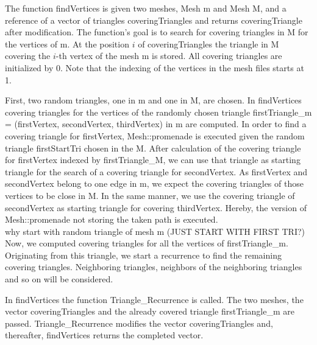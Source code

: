 \documentclass[10pt]{article}
\begin{document}
The function {\ttfamily findVertices} is given two meshes, {\ttfamily Mesh m} and {\ttfamily Mesh M}, and a reference of a vector of triangles {\ttfamily coveringTriangles} and returns {\ttfamily coveringTriangle} after modification. The function's goal is to search for covering triangles in {\ttfamily M} for the vertices of {\ttfamily  m}. At the position $i$ of {\ttfamily coveringTriangles} the triangle in {\ttfamily M} covering the $i$-th vertex of the mesh {\ttfamily m} is stored. All covering triangles are initialized by 0. Note that the indexing of the vertices in the mesh files starts at 1.

First, two random triangles, one in {\ttfamily m} and one in {\ttfamily M}, are chosen. In {\ttfamily findVertices} covering triangles for the vertices of the randomly chosen triangle {\ttfamily firstTriangle\_m = (firstVertex, secondVertex, thirdVertex)} in {\ttfamily m} are computed. In order to find a covering triangle for {\ttfamily firstVertex}, {\ttfamily Mesh::promenade} is executed given the random triangle {\ttfamily firstStartTri} chosen in the {\ttfamily M}. After calculation of the covering triangle for {\ttfamily firstVertex} indexed by {\ttfamily firstTriangle\_M}, we can use that triangle as starting triangle for the search of a covering triangle for {\ttfamily secondVertex}. As {\ttfamily firstVertex} and {\ttfamily secondVertex} belong to one edge in {\ttfamily m}, we expect the covering triangles of those vertices to be close in {\ttfamily M}. In the same manner, we use the covering triangle of {\ttfamily secondVertex} as starting triangle for covering {\ttfamily thirdVertex}. Hereby, the version of {\ttfamily Mesh::promenade} not storing the taken path is executed.\\

why start with random triangle of mesh m (JUST START WITH FIRST TRI?)\\

Now, we computed covering triangles for all the vertices of {\ttfamily firstTriangle\_m}. Originating from this triangle, we start a recurrence to find the remaining covering triangles. Neighboring triangles, neighbors of the neighboring triangles and so on will be considered.

In {\ttfamily findVertices} the function {\ttfamily Triangle\_Recurrence} is called. The two meshes, the vector {\ttfamily coveringTriangles} and the already covered triangle {\ttfamily firstTriangle\_m} are passed. {\ttfamily Triangle\_Recurrence} modifies the vector {\ttfamily coveringTriangles} and, thereafter, {\ttfamily findVertices} returns the completed vector.
\end{document}
